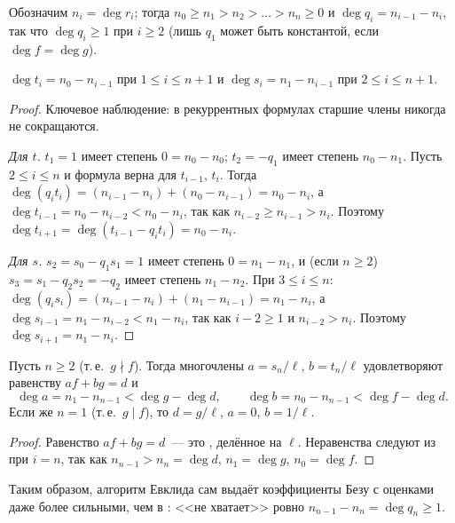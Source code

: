 Обозначим $n_i=\deg r_i$; тогда $n_0\ge n_1>n_2>\dots>n_n\ge0$ и $\deg q_i=n_{i-1}-n_i$, так что $\deg q_i\ge1$ при
$i\ge2$ (лишь $q_1$ может быть константой, если $\deg f=\deg g$).

\begin{lemma}[1.8b]
$\deg t_i=n_0-n_{i-1}$ при $1\le i\le n+1$ и $\deg s_i=n_1-n_{i-1}$ при $2\le i\le n+1$.
\end{lemma}

\begin{proof}
Ключевое наблюдение: в рекуррентных формулах старшие члены никогда не сокращаются.

\emph{Для $t$.} $t_1=1$ имеет степень $0=n_0-n_0$; $t_2=-q_1$ имеет степень $n_0-n_1$. Пусть $2\le i\le n$ и формула
верна для $t_{i-1}$, $t_i$. Тогда $\deg(q_it_i)=(n_{i-1}-n_i)+(n_0-n_{i-1})=n_0-n_i$, а
$\deg t_{i-1}=n_0-n_{i-2}<n_0-n_i$, так как $n_{i-2}\ge n_{i-1}>n_i$. Поэтому $\deg t_{i+1}=\deg(t_{i-1}-q_it_i)=n_0-n_i$.

\emph{Для $s$.} $s_2=s_0-q_1s_1=1$ имеет степень $0=n_1-n_1$, и (если $n\ge2$) $s_3=s_1-q_2s_2=-q_2$ имеет степень
$n_1-n_2$. При $3\le i\le n$: $\deg(q_is_i)=(n_{i-1}-n_i)+(n_1-n_{i-1})=n_1-n_i$, а $\deg s_{i-1}=n_1-n_{i-2}<n_1-n_i$,
так как $i-2\ge1$ и $n_{i-2}>n_i$. Поэтому $\deg s_{i+1}=n_1-n_i$.
\end{proof}

\begin{corollary}[1.8c]
Пусть $n\ge2$ (т.\,е.\ $g\nmid f$). Тогда многочлены $a=s_n/\ell$, $b=t_n/\ell$ удовлетворяют равенству $af+bg=d$ и
\[
\deg a=n_1-n_{n-1}<\deg g-\deg d,\qquad \deg b=n_0-n_{n-1}<\deg f-\deg d .
\]
Если же $n=1$ (т.\,е.\ $g\mid f$), то $d=g/\ell$, $a=0$, $b=1/\ell$.
\end{corollary}

\begin{proof}
Равенство $af+bg=d$~--- это , делённое на $\ell$. Неравенства следуют из  при $i=n$, так как
$n_{n-1}>n_n=\deg d$, $n_1=\deg g$, $n_0=\deg f$.
\end{proof}

Таким образом, алгоритм Евклида сам выдаёт коэффициенты Безу с оценками даже более сильными, чем в :
<<не хватает>> ровно $n_{n-1}-n_n=\deg q_n\ge1$.

